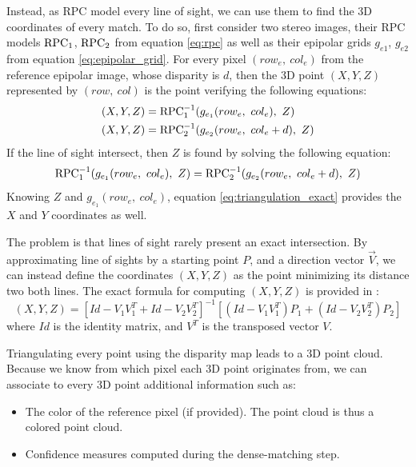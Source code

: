 Instead, as RPC model every line of sight, we can use them to find the 3D coordinates of every match. To do so, first consider two stereo images, their RPC models ${\mathrm{RPC}}_1$, ${\mathrm{RPC}}_2$ from equation \eqref{eq:rpc} as well as their epipolar grids $g_{e1}$, $g_{e2}$ from equation \eqref{eq:epipolar_grid}. For every pixel $(row_e, ~col_e)$ from the reference epipolar image, whose disparity is $d$, then the 3D point $(X, Y, Z)$ represented by $(row, ~col)$ is the point verifying the following equations:
\begin{align}
    (X, Y, Z) &= {\mathrm{RPC}}^{-1}_1(g_{e_1}(row_e,~col_e),~Z)\label{eq:triangulation_exact}\\
    (X, Y, Z) &= {\mathrm{RPC}}^{-1}_2(g_{e_2}(row_e,~col_e+d),~Z) 
\end{align}
If the line of sight intersect, then $Z$ is found by solving the following equation:
\begin{equation}
     {\mathrm{RPC}}^{-1}_1(g_{e_1}(row_e,~col_e),~Z) = {\mathrm{RPC}}^{-1}_2(g_{e_2}(row_e,~col_e+d),~Z) 
\end{equation}
Knowing $Z$ and $g_{e_1}(row_e,~col_e)$, equation \eqref{eq:triangulation_exact} provides the $X$ and $Y$ coordinates as well.

The problem is that lines of sight rarely present an exact intersection. By approximating line of sights by a starting point $P$, and a direction vector $\overrightarrow{V}$, we can instead define the coordinates $(X,Y,Z)$ as the point minimizing its distance two both lines. The exact formula for computing $(X,Y,Z)$ is provided in \cite{delvit_geometric_2006}:
\begin{equation}
    (X,Y,Z) = \left[ Id - V_1V_1^T + Id - V_2V_2^T \right]^{-1} \left[ (Id - V_1V_1^T)P_1 + (Id - V_2V_2^T)P_2 \right]
\end{equation}
where $Id$ is the identity matrix, and $V^T$ is the transposed vector $V$.

Triangulating every point using the disparity map leads to a 3D point cloud. Because we know from which pixel each 3D point originates from, we can associate to every 3D point additional information such as:
\begin{itemize}
    \item The color of the reference pixel (if provided). The point cloud is thus a colored point cloud.
    \item Confidence measures computed during the dense-matching step. 
\end{itemize}

